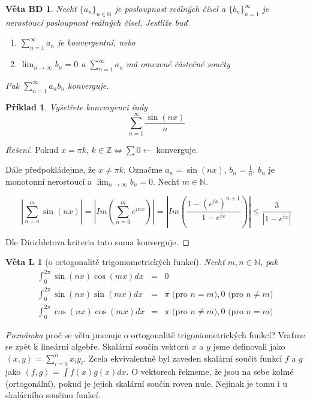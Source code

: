 \documentclass[11pt,a4paper]{article}
\newcounter{vety}
\newtheorem{vetal}[vety]{Věta L}
\newtheorem{vetabd}[vety]{Věta BD}
\newtheorem*{priklad}{Příklad}
\begin{document}
\begin{vetabd}
Nechť $\{ a_n \}_{n \in \mathbb{N}}$ je posloupnost reálných čísel a $\{ b_n \}_{n=1}^{\infty}$ je nerostoucí posloupnost reálných čísel. Jestliže buď
\begin{enumerate}
\item[(A)] $\sum_{n=1}^{\infty} a_n$ je konvergentní, nebo
\item[(D)] $\lim_{n \rightarrow \infty} b_n = 0$ a $\sum_{n=1}^{\infty} a_n$ má omezené částečné součty
\end{enumerate}
Pak $\sum_{n=1}^{\infty} a_n b_n$ konverguje.
\end{vetabd}

\begin{priklad}
Vyšetřete konvergenci řady
$$\sum_{n=1}^\infty \frac{\sin (nx)}{n}$$
\end{priklad}

\begin{proof}[Řešení]
Pokud $x= \pi k$, $k \in \mathbb{Z} \Leftrightarrow \sum 0 \leftarrow$ konverguje.

Dále předpokládejme, že $x \neq \pi k$. Označme $a_n = \sin (nx)$, $b_n = \frac{1}{n}$. $b_n$ je monotonní nerostoucí a $\lim_{n \rightarrow \infty} b_n = 0$. Nechť $m \in \mathbb{N}$.

$$\left | \sum_{n=a}^{m} \sin (nx) \right | = \left | Im \left( \sum_{n=0}^{m} e^{inx} \right ) \right | = \left | Im \left( \frac{1- \left( e^{ix} \right)^{n+1}  }{1-e^{ix}} \right) \right | \leq \frac{3}{ \left | 1-e^{ix} \right | }$$

Dle Dirichletova kriteria tato suma konverguje.

\end{proof}

\begin{vetal}[o ortogonalitě trigoniometrických funkcí]
Nechť $m, n \in \mathbb{N}$, pak
\begin{eqnarray}
\int_{0}^{2 \pi} \sin (nx) \cos (mx) dx & = & 0 \nonumber\\
\int_{0}^{2 \pi} \sin (nx) \sin (mx) dx & = & \pi \textrm{ (pro $n=m$)}, 0 \textrm{ (pro $n \neq m$) } \nonumber\\
\int_{0}^{2 \pi} \cos (nx) \cos (mx) dx & = & \pi \textrm{ (pro $n \neq m$)}, 0 \textrm{ (pro $n=m$)} \nonumber
\end{eqnarray}
\end{vetal}

\emph{Poznámka} proč se věta jmenuje o ortogonalitě trigoniometrických funkcí? Vraťme se zpět k lineární algebře. Skalární součin vektorů $x$ a $y$ jsme definovali jako $\left\langle x,y \right\rangle = \sum_{i=0}^{n} x_i y_i$. Zcela ekvivalentně byl zaveden skalární součit funkcí $f$ a $g$ jako $\left\langle f, g \right\rangle = \int f(x) g(x) dx$. O vektorech řekneme, že jsou na sebe kolmé (ortogonální), pokud je jejich skalární součin roven nule. Nejinak je tomu i u skalárního součinu funkcí. 
\end{document}
